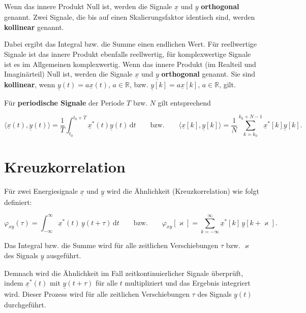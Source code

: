\begin{definition}
Wenn das innere Produkt Null ist, werden die Signale $\underline{x}$ und $\underline{y}$ \textbf{orthogonal}
genannt. Zwei Signale, die bis auf einen Skalierungsfaktor identisch sind,
werden \textbf{kollinear} genannt.
\end{definition}

Dabei ergibt das Integral bzw. die Summe einen endlichen Wert. Für reellwertige Signale ist das innere Produkt ebenfalls reellwertig, für komplexwertige Signale ist es im Allgemeinen komplexwertig. Wenn das innere Produkt (im Realteil und Imaginärteil) Null ist, werden die Signale $\underline{x}$ und $\underline{y}$ \textbf{orthogonal} genannt. Sie sind \textbf{kollinear}, wenn $\underline{y}(t) = a\underline{x}(t)$, $a \in \mathbb{R}$, bzw. $\underline{y}[k] = a\underline{x}[k]$, $a \in \mathbb{R}$, gilt.

Für \textbf{periodische Signale} der Periode $T$ bzw. $N$ gilt entsprechend

$$
\langle \underline{x}(t), \underline{y}(t) \rangle = \frac{1}{T} \int_{t_0}^{t_0+T} \underline{x}^*(t)\underline{y}(t)\,\mathrm{d}t
\qquad \text{bzw.} \qquad
\langle \underline{x}[k], \underline{y}[k] \rangle = \frac{1}{N} \sum_{k=k_0}^{k_0+N-1} \underline{x}^*[k]\underline{y}[k].
$$


\section{Kreuzkorrelation}
\label{sec:kreuzkorrelation}

\begin{definition}
Für zwei Energiesignale $\underline{x}$ und $\underline{y}$ wird die Ähnlichkeit (Kreuzkorrelation) wie folgt definiert:

$$
\varphi_{xy}(\tau) = \int_{-\infty}^{\infty} \underline{x}^*(t)\,\underline{y}(t+\tau)\,\mathrm{d}t
\qquad \text{bzw.} \qquad
\varphi_{xy}[\varkappa] = \sum_{k=-\infty}^{\infty} \underline{x}^*[k]\,\underline{y}[k+\varkappa].
$$

Das Integral bzw. die Summe wird für alle zeitlichen Verschiebungen $\tau$ bzw. $\varkappa$ des Signals $\underline{y}$ ausgeführt.
\end{definition}


Demnach wird die Ähnlichkeit im Fall zeitkontinuierlicher Signale überprüft, indem $\underline{x}^*(t)$ mit $\underline{y}(t+\tau)$ für alle $t$ multipliziert und das Ergebnis integriert wird. Dieser Prozess wird für alle zeitlichen Verschiebungen $\tau$ des Signals $\underline{y}(t)$ durchgeführt.

